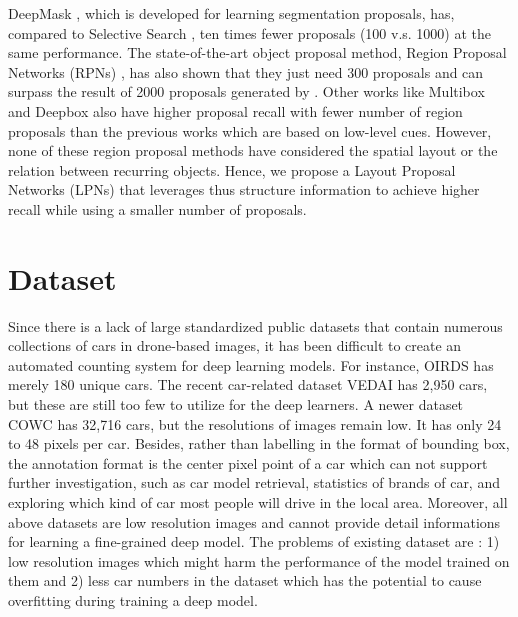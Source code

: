 \documentclass[10pt,twocolumn,letterpaper]{article}
\begin{document}
DeepMask \cite{32_pinheiro2015learning}, which is developed for learning segmentation proposals, has, compared to Selective Search \cite{17_uijlings2013selective}, ten times fewer proposals (100 v.s. 1000) at the same performance. The state-of-the-art object proposal method, Region Proposal Networks (RPNs) \cite{21_ren2015faster}, has also shown that they just need 300 proposals and can surpass the result of 2000 proposals generated by \cite{17_uijlings2013selective}. Other works like Multibox \cite{25_szegedy2014scalable} and Deepbox \cite{29_zitnick2014edge} also have higher proposal recall with fewer number of region proposals than the previous works which are based on low-level cues. However, none of these region proposal methods have considered the spatial layout or the relation between recurring objects. Hence, we propose a Layout Proposal Networks (LPNs) that leverages thus structure information to achieve higher recall while using a smaller number of proposals.

\section{Dataset}

Since there is a lack of large standardized public datasets that contain numerous collections of cars in drone-based images, it has been difficult to create an automated counting system for deep learning models.
%
For instance, OIRDS \cite{34_tanner2009overhead} has merely 180 unique cars. %
%
The recent car-related dataset VEDAI \cite{35_razakarivony2016vehicle} has 2,950 cars, but these are still too few to utilize for the deep learners. %
%
A newer dataset COWC \cite{04_mundhenk2016large} has 32,716 cars, but the resolutions of images remain low. It has only 24 to 48 pixels per car. Besides, rather than labelling in the format of bounding box, the annotation format is the center pixel point of a car which can not support further investigation, such as car model retrieval, statistics of brands of car, and exploring which kind of car most people will drive in the local area.
%
Moreover, all above datasets are low resolution images and cannot provide detail informations for learning a fine-grained deep model. 
%
The problems of existing dataset are : 1) low resolution images which might harm the performance of the model trained on them and 2) less car numbers in the dataset which has the potential to cause overfitting during training a deep model.
\end{document}
